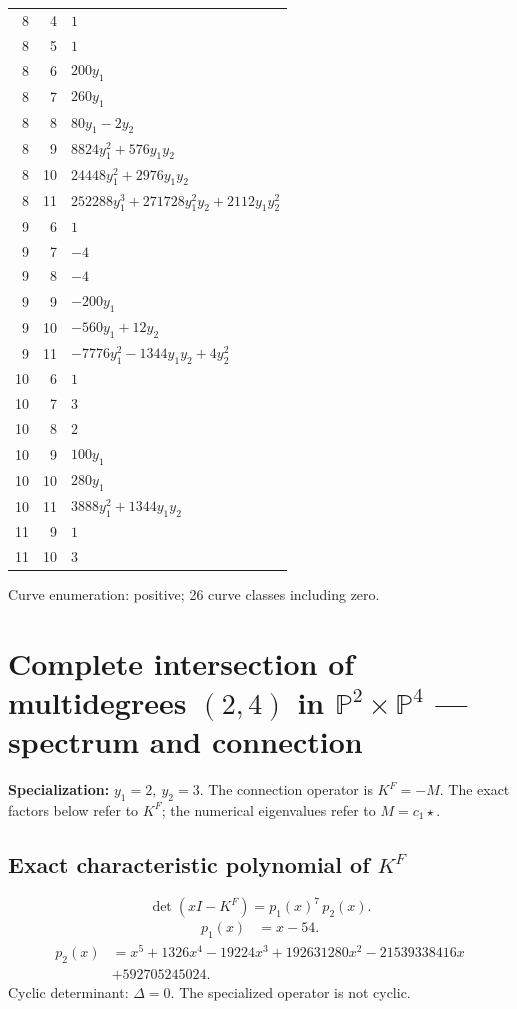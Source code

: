 \documentclass[10pt,a4paper]{article}
\begin{document}
{\begin{longtable}{rrp{125mm}}
8 & 4 & $1$\\
8 & 5 & $1$\\
8 & 6 & $200 y_{1}$\\
8 & 7 & $260 y_{1}$\\
8 & 8 & $80 y_{1} - 2 y_{2}$\\
8 & 9 & $8824 y_{1}^{2} + 576 y_{1} y_{2}$\\
8 & 10 & $24448 y_{1}^{2} + 2976 y_{1} y_{2}$\\
8 & 11 & $252288 y_{1}^{3} + 271728 y_{1}^{2} y_{2} + 2112 y_{1} y_{2}^{2}$\\
9 & 6 & $1$\\
9 & 7 & $-4$\\
9 & 8 & $-4$\\
9 & 9 & $- 200 y_{1}$\\
9 & 10 & $- 560 y_{1} + 12 y_{2}$\\
9 & 11 & $- 7776 y_{1}^{2} - 1344 y_{1} y_{2} + 4 y_{2}^{2}$\\
10 & 6 & $1$\\
10 & 7 & $3$\\
10 & 8 & $2$\\
10 & 9 & $100 y_{1}$\\
10 & 10 & $280 y_{1}$\\
10 & 11 & $3888 y_{1}^{2} + 1344 y_{1} y_{2}$\\
11 & 9 & $1$\\
11 & 10 & $3$\\
\end{longtable}}
Curve enumeration: positive; 26 curve classes including zero.
\clearpage\section*{Complete intersection of multidegrees $(2,4)$ in $\mathbb P^{2}\times \mathbb P^{4}$ --- spectrum and connection}
\textbf{Specialization:} $y_1=2,\ y_2=3$. The connection operator is $K^F=-M$. The exact factors below refer to $K^F$; the numerical eigenvalues refer to $M=c_1\star$.
\subsection*{Exact characteristic polynomial of $K^F$}
\[\det(xI-K^F)=p_{1}(x)^{7}\,p_{2}(x).\]
\[\begin{aligned}p_{1}(x)&=x - 54.\end{aligned}\]
\[\begin{aligned}p_{2}(x)&=x^{5} + 1326 x^{4} - 19224 x^{3} + 192631280 x^{2} - 21539338416 x\\&+592705245024.\end{aligned}\]
Cyclic determinant: $\Delta=0$. The specialized operator is not cyclic.
\end{document}
